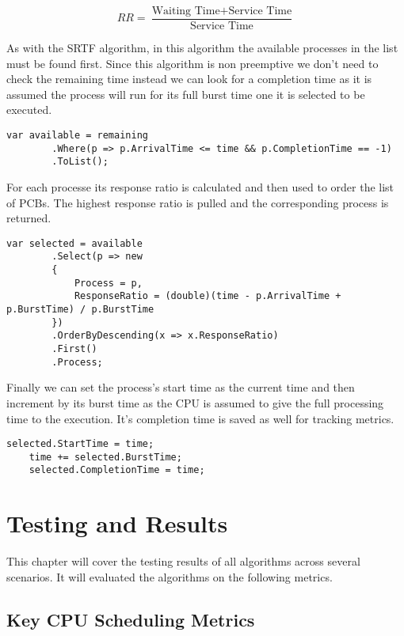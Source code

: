 \documentclass[conference]{report}
\begin{document}
\[
RR = \frac{\text{Waiting Time} + \text{Service Time}}{\text{Service Time}}
\]

As with the SRTF algorithm, in this algorithm the available processes in the list must be found first. Since this algorithm is non preemptive we don't need to check the remaining time instead we can look for a completion time as it is assumed the process will run for its full burst time one it is selected to be executed.

\hfill
\begin{lstlisting}[caption={HRRN Finding Available Processes}, label=code:hrrn-1]
    var available = remaining
        .Where(p => p.ArrivalTime <= time && p.CompletionTime == -1)
        .ToList();
\end{lstlisting}

For each processe its response ratio is calculated and then used to order the list of PCBs. The highest response ratio is pulled and the corresponding process is returned.

\hfill
\begin{lstlisting}[caption={HRRN Calculate Response Ratio and Selected Highest}, label=code:hrrn-2]
    var selected = available
        .Select(p => new
        {
            Process = p,
            ResponseRatio = (double)(time - p.ArrivalTime + p.BurstTime) / p.BurstTime
        })
        .OrderByDescending(x => x.ResponseRatio)
        .First()
        .Process;
\end{lstlisting}

Finally we can set the process's start time as the current time and then increment by its burst time as the CPU is assumed to give the full processing time to the execution. It's completion time is saved as well for tracking metrics.

\hfill
\begin{lstlisting}[caption={HRRN Set Start and Completed Time}, label=code:hrrn-3]
    selected.StartTime = time;
    time += selected.BurstTime;
    selected.CompletionTime = time;
\end{lstlisting}

\chapter{Testing and Results}
This chapter will cover the testing results of all algorithms across several scenarios. It will evaluated the algorithms on the following metrics.

\section*{Key CPU Scheduling Metrics}
\end{document}
